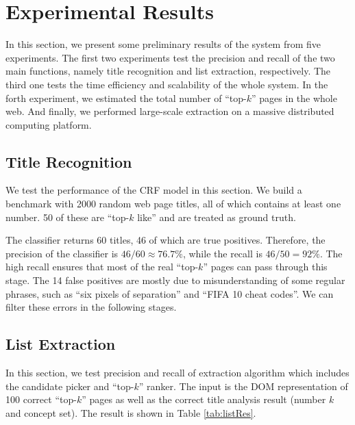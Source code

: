 \chapter{Experimental Results}
\label{sec:eval}

In this section, we present some preliminary results of the system from five
experiments.  The first two experiments test the precision and recall
of the two main functions, namely title recognition and list extraction,
respectively.
The third one tests the time efficiency and scalability of the whole system.
In the forth experiment, we estimated the total number of ``top-$k$'' pages in the whole web.
And finally, we performed large-scale extraction
on a massive distributed computing platform.

\section{Title Recognition}
\label{sec:evalTitle}

We test the performance of the CRF model in this section.
We build a benchmark with 2000 random web page titles,
all of which contains at least one number.
50 of these are ``top-$k$ like'' and are treated as ground truth.

The classifier returns 60 titles, 46 of which are
true positives. Therefore, the precision of the classifier is
$46/60\approx76.7\%$, while the recall is $46/50=92\%$.
The high recall ensures that most of the real ``top-$k$'' pages can pass
through this stage.
The 14 false positives are mostly due to misunderstanding of
some regular phrases, such as ``six pixels of separation''
and ``FIFA 10 cheat codes''.
We can filter these errors in the following stages.




\section{List Extraction}

\label{sec:evalList}

In this section, we test precision and recall of extraction algorithm
which includes the candidate picker and ``top-$k$'' ranker.
The input is the DOM representation of 100 correct ``top-$k$'' pages
as well as the correct title analysis result (number $k$ and concept set).
The result is shown in Table \ref{tab:listRes}.

